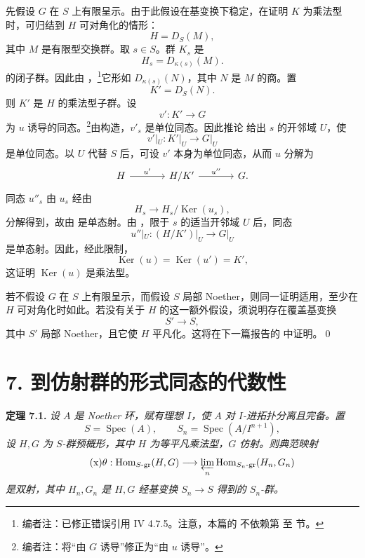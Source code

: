 先假设 \(G\) 在 \(S\) 上有限呈示。由于此假设在基变换下稳定，在证明 \(K\) 为乘法型时，可归结到 \(H\) 可对角化的情形：
\[
  H=D_S(M),
\]
其中 \(M\) 是有限型交换群。取 \(s\in S\)。群 \(K_s\) 是
\[
  H_s=D_{\kappa(s)}(M).
\]
的闭子群。因此由 ，\footnote{编者注：已修正错误引用 IV 4.7.5。注意，本篇的  不依赖第  至  节。}它形如 \(D_{\kappa(s)}(N)\)，其中 \(N\) 是 \(M\) 的商。置
\[
  K'=D_S(N).
\]
则 \(K'\) 是 \(H\) 的乘法型子群。设
\[
  v':K'\longrightarrow G
\]
为 \(u\) 诱导的同态。\footnote{编者注：将“由 \(G\) 诱导”修正为“由 \(u\) 诱导”。}由构造，\(v'_s\) 是单位同态。因此推论  给出 \(s\) 的开邻域 \(U\)，使
\[
  v'|_U:K'|_U\longrightarrow G|_U
\]
是单位同态。以 \(U\) 代替 \(S\) 后，可设 \(v'\) 本身为单位同态，从而 \(u\) 分解为
\[
\begin{tikzcd}[column sep=large]
  H
    \arrow[r,"u'"]
  & H/K'
    \arrow[r,"u''"]
  & G.
\end{tikzcd}
\]
同态 \(u''_s\) 由 \(u_s\) 经由
\[
  H_s\longrightarrow H_s/\operatorname{Ker}(u_s),
\]
分解得到，故由  是单态射。由 ，限于 \(s\) 的适当开邻域 \(U\) 后，同态
\[
  u''|_U:(H/K')|_U\longrightarrow G|_U
\]
是单态射。因此，经此限制，
\[
  \operatorname{Ker}(u)
  =\operatorname{Ker}(u')
  =K',
\]
这证明 \(\operatorname{Ker}(u)\) 是乘法型。

若不假设 \(G\) 在 \(S\) 上有限呈示，而假设 \(S\) 局部 Noether，则同一证明适用，至少在 \(H\) 可对角化时如此。若没有关于 \(H\) 的这一额外假设，须说明存在覆盖基变换
\[
  S'\longrightarrow S,
\]
其中 \(S'\) 局部 Noether，且它使 \(H\) 平凡化。这将在下一篇报告的  中证明。\qed

\section*{7. 到仿射群的形式同态的代数性}

\medskip
\noindent{}\textbf{定理 7.1.}
\textit{设 \(A\) 是 Noether 环，赋有理想 \(I\)，使 \(A\) 对 \(I\)-进拓扑分离且完备。置
\[
  S=\operatorname{Spec}(A),
  \qquad
  S_n=\operatorname{Spec}(A/I^{n+1}),
\]
设 \(H,G\) 为 \(S\)-群预概形，其中 \(H\) 为等平凡乘法型，\(G\) 仿射。则典范映射
\begin{equation}
  \tag{x}
  \theta:
  \operatorname{Hom}_{S\text{-}\mathrm{gr}}(H,G)
  \longrightarrow
  \varprojlim_n
  \operatorname{Hom}_{S_n\text{-}\mathrm{gr}}(H_n,G_n)
\end{equation}
是双射，其中 \(H_n,G_n\) 是 \(H,G\) 经基变换 \(S_n\to S\) 得到的 \(S_n\)-群。}


